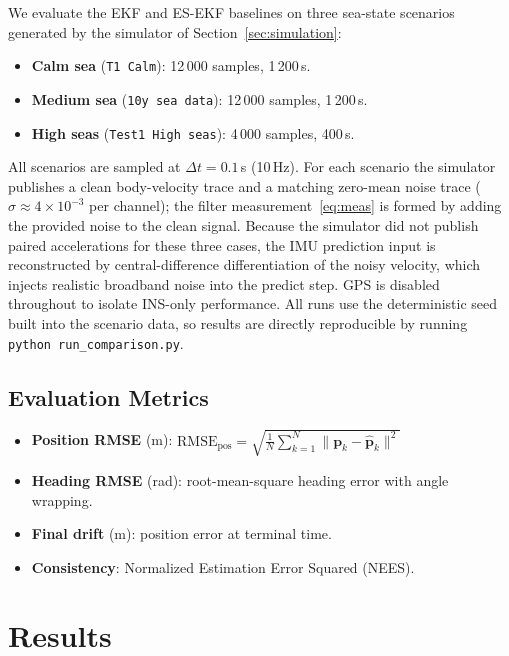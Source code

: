 \documentclass[conference]{IEEEtran}
\begin{document}
We evaluate the EKF and ES-EKF baselines on three sea-state scenarios generated by the simulator of Section~\ref{sec:simulation}:
\begin{itemize}
  \item \textbf{Calm sea} (\texttt{T1 Calm}): 12\,000 samples, 1\,200\,s.
  \item \textbf{Medium sea} (\texttt{10y sea data}): 12\,000 samples, 1\,200\,s.
  \item \textbf{High seas} (\texttt{Test1 High seas}): 4\,000 samples, 400\,s.
\end{itemize}
All scenarios are sampled at $\Delta t = 0.1$\,s (10\,Hz). For each scenario the simulator publishes a clean body-velocity trace and a matching zero-mean noise trace ($\sigma \approx 4 \times 10^{-3}$ per channel); the filter measurement~\eqref{eq:meas} is formed by adding the provided noise to the clean signal. Because the simulator did not publish paired accelerations for these three cases, the IMU prediction input is reconstructed by central-difference differentiation of the noisy velocity, which injects realistic broadband noise into the predict step. GPS is disabled throughout to isolate INS-only performance. All runs use the deterministic seed built into the scenario data, so results are directly reproducible by running \texttt{python run\_comparison.py}.

\subsection{Evaluation Metrics}

\begin{itemize}
  \item \textbf{Position RMSE} (m): $\text{RMSE}_{\text{pos}} = \sqrt{\frac{1}{N}\sum_{k=1}^{N}\|\mathbf{p}_k - \hat{\mathbf{p}}_k\|^2}$
  \item \textbf{Heading RMSE} (rad): root-mean-square heading error with angle wrapping.
  \item \textbf{Final drift} (m): position error at terminal time.
  \item \textbf{Consistency}: Normalized Estimation Error Squared (NEES).
\end{itemize}

\section{Results}
\label{sec:results}
\end{document}
